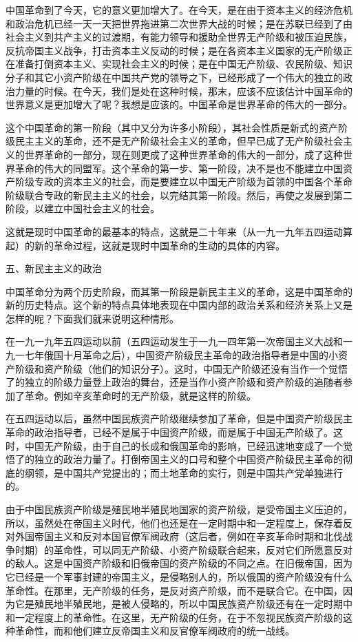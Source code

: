 \documentclass[UTF8, 12pt, a4paper]{ctexrep}
\begin{document}
中国革命到了今天，它的意义更加增大了。在今天，是在由于资本主义的经济危机和政治危机已经一天一天把世界拖进第二次世界大战的时候；是在苏联已经到了由社会主义到共产主义的过渡期，有能力领导和援助全世界无产阶级和被压迫民族，反抗帝国主义战争，打击资本主义反动的时候；是在各资本主义国家的无产阶级正在准备打倒资本主义、实现社会主义的时候；是在中国无产阶级、农民阶级、知识分子和其它小资产阶级在中国共产党的领导之下，已经形成了一个伟大的独立的政治力量的时候。在今天，我们是处在这种时候，那末，应该不应该估计中国革命的世界意义是更加增大了呢？我想是应该的。中国革命是世界革命的伟大的一部分。

这个中国革命的第一阶段（其中又分为许多小阶段），其社会性质是新式的资产阶级民主主义的革命，还不是无产阶级社会主义的革命，但早已成了无产阶级社会主义的世界革命的一部分，现在则更成了这种世界革命的伟大的一部分，成了这种世界革命的伟大的同盟军。这个革命的第一步、第一阶段，决不是也不能建立中国资产阶级专政的资本主义的社会，而是要建立以中国无产阶级为首领的中国各个革命阶级联合专政的新民主主义的社会，以完结其第一阶段。然后，再使之发展到第二阶段，以建立中国社会主义的社会。

这就是现时中国革命的最基本的特点，这就是二十年来（从一九一九年五四运动算起）的新的革命过程，这就是现时中国革命的生动的具体的内容。

五、新民主主义的政治

中国革命分为两个历史阶段，而其第一阶段是新民主主义的革命，这是中国革命的新的历史特点。这个新的特点具体地表现在中国内部的政治关系和经济关系上又是怎样的呢？下面我们就来说明这种情形。

在一九一九年五四运动以前（五四运动发生于一九一四年第一次帝国主义大战和一九一七年俄国十月革命之后），中国资产阶级民主革命的政治指导者是中国的小资产阶级和资产阶级（他们的知识分子）。这时，中国无产阶级还没有当作一个觉悟了的独立的阶级力量登上政治的舞台，还是当作小资产阶级和资产阶级的追随者参加了革命。例如辛亥革命时的无产阶级，就是这样的阶级。

在五四运动以后，虽然中国民族资产阶级继续参加了革命，但是中国资产阶级民主革命的政治指导者，已经不是属于中国资产阶级，而是属于中国无产阶级了。这时，中国无产阶级，由于自己的长成和俄国革命的影响，已经迅速地变成了一个觉悟了的独立的政治力量了。打倒帝国主义的口号和整个中国资产阶级民主革命的彻底的纲领，是中国共产党提出的；而土地革命的实行，则是中国共产党单独进行的。

由于中国民族资产阶级是殖民地半殖民地国家的资产阶级，是受帝国主义压迫的，所以，虽然处在帝国主义时代，他们也还是在一定时期中和一定程度上，保存着反对外国帝国主义和反对本国官僚军阀政府（这后者，例如在辛亥革命时期和北伐战争时期）的革命性，可以同无产阶级、小资产阶级联合起来，反对它们所愿意反对的敌人。这是中国资产阶级和旧俄帝国的资产阶级的不同之点。在旧俄帝国，因为它已经是一个军事封建的帝国主义，是侵略别人的，所以俄国的资产阶级没有什么革命性。在那里，无产阶级的任务，是反对资产阶级，而不是联合它。在中国，因为它是殖民地半殖民地，是被人侵略的，所以中国民族资产阶级还有在一定时期中和一定程度上的革命性。在这里，无产阶级的任务，在于不忽视民族资产阶级的这种革命性，而和他们建立反帝国主义和反官僚军阀政府的统一战线。
\end{document}
